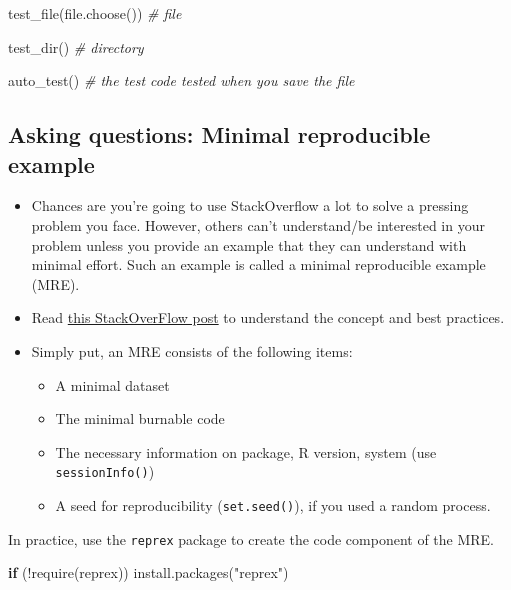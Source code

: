 \documentclass[
]{book}
\newenvironment{Shaded}{\begin{snugshade}}{\end{snugshade}}
\newcommand{\CommentTok}[1]{\textcolor[rgb]{0.56,0.35,0.01}{\textit{#1}}}
\newcommand{\ControlFlowTok}[1]{\textcolor[rgb]{0.13,0.29,0.53}{\textbf{#1}}}
\newcommand{\FunctionTok}[1]{\textcolor[rgb]{0.00,0.00,0.00}{#1}}
\newcommand{\NormalTok}[1]{#1}
\newcommand{\SpecialCharTok}[1]{\textcolor[rgb]{0.00,0.00,0.00}{#1}}
\newcommand{\StringTok}[1]{\textcolor[rgb]{0.31,0.60,0.02}{#1}}
\providecommand{\tightlist}{%
  \setlength{\itemsep}{0pt}\setlength{\parskip}{0pt}}
\begin{document}
\begin{Shaded}
\begin{Highlighting}[]
\FunctionTok{test\_file}\NormalTok{(}\FunctionTok{file.choose}\NormalTok{()) }\CommentTok{\# file }

\FunctionTok{test\_dir}\NormalTok{() }\CommentTok{\# directory}

\FunctionTok{auto\_test}\NormalTok{() }\CommentTok{\# the test code tested when you save the file }
\end{Highlighting}
\end{Shaded}

\hypertarget{asking-questions-minimal-reproducible-example}{%
\subsection{Asking questions: Minimal reproducible example}\label{asking-questions-minimal-reproducible-example}}

\begin{itemize}
\item
  Chances are you're going to use StackOverflow a lot to solve a pressing problem you face. However, others can't understand/be interested in your problem unless you provide an example that they can understand with minimal effort. Such an example is called a minimal reproducible example (MRE).
\item
  Read \href{https://stackoverflow.com/questions/5963269/how-to-make-a-great-r-reproducible-example}{this StackOverFlow post} to understand the concept and best practices.
\item
  Simply put, an MRE consists of the following items:

  \begin{itemize}
  \tightlist
  \item
    A minimal dataset
  \item
    The minimal burnable code
  \item
    The necessary information on package, R version, system (use \texttt{sessionInfo()})
  \item
    A seed for reproducibility (\texttt{set.seed()}), if you used a random process.
  \end{itemize}
\end{itemize}

In practice, use the \texttt{reprex} package to create the code component of the MRE.

\begin{Shaded}
\begin{Highlighting}[]
\ControlFlowTok{if}\NormalTok{ (}\SpecialCharTok{!}\FunctionTok{require}\NormalTok{(reprex)) }\FunctionTok{install.packages}\NormalTok{(}\StringTok{"reprex"}\NormalTok{)}
\end{Highlighting}
\end{Shaded}
\end{document}
